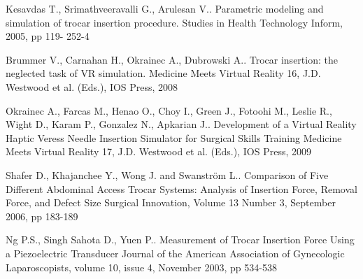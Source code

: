 
\begin{thebibliography}{10}
{\sc Kesavdas T., Srimathveeravalli G., Arulesan V.}. {Parametric modeling and simulation of trocar insertion procedure}. Studies in Health Technology Inform, 2005, pp 119- 252-4

{\sc Brummer V., Carnahan H., Okrainec A., Dubrowski A.}. {Trocar insertion: the neglected task of VR simulation}. Medicine Meets Virtual Reality 16, J.D. Westwood et al. (Eds.), IOS Press, 2008

{\sc Okrainec A., Farcas M., Henao O., Choy I., Green J., Fotoohi M., Leslie R., Wight D., Karam P., Gonzalez N., Apkarian J.}.
\newblock Development of a Virtual Reality Haptic Veress Needle Insertion Simulator for Surgical Skills Training
\newblock Medicine Meets Virtual Reality 17, J.D. Westwood et al. (Eds.), IOS Press, 2009

{\sc Shafer D., Khajanchee Y., Wong J. and Swanström L.}.
\newblock Comparison of Five Different Abdominal Access Trocar Systems: Analysis of Insertion Force, Removal Force, and Defect Size
\newblock Surgical Innovation, Volume 13 Number 3, September 2006, pp 183-189

{\sc Ng P.S., Singh Sahota D., Yuen P.}.
\newblock Measurement of Trocar Insertion Force Using a Piezoelectric Transducer
\newblock Journal of the American Association of Gynecologic Laparoscopists, volume 10, issue 4, November 2003, pp 534-538
\end{thebibliography}